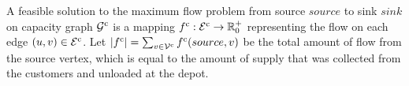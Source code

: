 
A feasible solution to the maximum flow problem   from source
$source$
to sink
$sink$
on capacity graph
$ \mathcal G^{\rm c}$
is a mapping
$ f^{\rm c}: \mathcal E^{\rm c} \rightarrow \mathbb{R}^+_0$
representing the flow on each edge
$(u,v) \in \mathcal E^{\rm c}$.
Let
$|f^{\rm c}| = \sum_{v \in \mathcal V^{\rm c}} f^{\rm c}(source, v)$
be the total amount of flow from the source vertex, which is equal to the amount of supply that was collected from the customers and unloaded at the depot.

